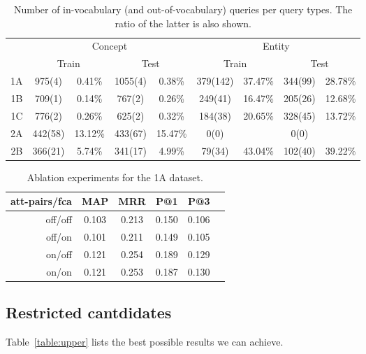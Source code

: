 \documentclass[11pt,a4paper]{article}
\begin{document}
\begin{table*}
	\centering
	\begin{tabular}{r|cccc|cccc}
    \toprule
		& \multicolumn{4}{c|}{Concept} & \multicolumn{4}{c}{Entity} \\
    & \multicolumn{2}{c}{Train} &
     \multicolumn{2}{c|}{Test} &
     \multicolumn{2}{c}{Train} &
     \multicolumn{2}{c}{Test} \\
     \midrule
1A & 975(4) & 0.41\%	&1055(4) & 0.38\%	&379(142) & 37.47\%	&344(99) & 28.78\% \\
1B & 709(1) & 0.14\%	&767(2) & 0.26\%	&249(41) & 16.47\%	&205(26) & 12.68\% \\
1C & 776(2) & 0.26\%	&625(2) & 0.32\%	&184(38) & 20.65\%	&328(45) & 13.72\% \\
2A & 442(58) & 13.12\%	&433(67) & 15.47\%	&0(0) & 	& 0(0) & \\
2B & 366(21) & 5.74\%	&341(17) & 4.99\%	&79(34) & 43.04\%	&102(40) & 39.22\% \\
\bottomrule
	\end{tabular}
  \caption{Number of in-vocabulary (and out-of-vocabulary) queries per query
  types.  The ratio of the latter is also shown.}
\label{table:coverage}
\end{table*}


\begin{table}
	\centering
	\begin{tabular}{r|ccccc}
att-pairs/fca & MAP & MRR & P@1 & P@3 \\ \hline
off/off & 0.103 & 0.213 & 0.150 & 0.106 \\
off/on  & 0.101 & 0.211 & 0.149 & 0.105 \\
on/off  & 0.121 & 0.254 & 0.189 & 0.129 \\
on/on   & 0.121 & 0.253 & 0.187 & 0.130 \\
	\end{tabular}
\caption{Ablation experiments for the 1A dataset.}
\label{table:ablation1A}
\end{table}

\subsection{Restricted cantdidates}

Table~\ref{table:upper} lists the best possible results we can achieve.
\end{document}
